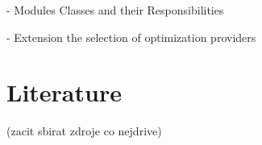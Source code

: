 \documentclass[11pt,twoside,a4paper]{book}
\begin{document}
- Modules Classes and their Responsibilities

- Extension the selection of optimization providers




 



\section{Literature}
(zacit sbirat zdroje co nejdrive)




\printbibliography
\appendix





\end{document}
